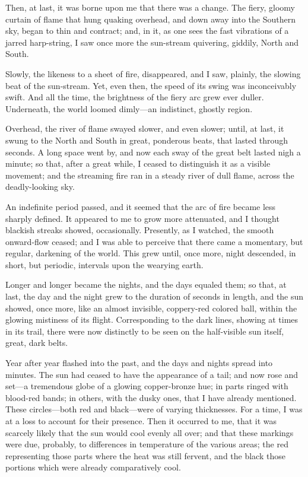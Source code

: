 Then, at last, it was borne upon me that there was a change. The fiery, gloomy curtain of flame that hung quaking overhead, and down away into the Southern sky, began to thin and contract; and, in it, as one sees the fast vibrations of a jarred harp-string, I saw once more the sun-stream quivering, giddily, North and South.

Slowly, the likeness to a sheet of fire, disappeared, and I saw, plainly, the slowing beat of the sun-stream. Yet, even then, the speed of its swing was inconceivably swift. And all the time, the brightness of the fiery arc grew ever duller. Underneath, the world loomed dimly---an indistinct, ghostly region.

Overhead, the river of flame swayed slower, and even slower; until, at last, it swung to the North and South in great, ponderous beats, that lasted through seconds. A long space went by, and now each sway of the great belt lasted nigh a minute; so that, after a great while, I ceased to distinguish it as a visible movement; and the streaming fire ran in a steady river of dull flame, across the deadly-looking sky.

An indefinite period passed, and it seemed that the arc of fire became less sharply defined. It appeared to me to grow more attenuated, and I thought blackish streaks showed, occasionally. Presently, as I watched, the smooth onward-flow ceased; and I was able to perceive that there came a momentary, but regular, darkening of the world. This grew until, once more, night descended, in short, but periodic, intervals upon the wearying earth.

Longer and longer became the nights, and the days equaled them; so that, at last, the day and the night grew to the duration of seconds in length, and the sun showed, once more, like an almost invisible, coppery-red colored ball, within the glowing mistiness of its flight. Corresponding to the dark lines, showing at times in its trail, there were now distinctly to be seen on the half-visible sun itself, great, dark belts.

Year after year flashed into the past, and the days and nights spread into minutes. The sun had ceased to have the appearance of a tail; and now rose and set---a tremendous globe of a glowing copper-bronze hue; in parts ringed with blood-red bands; in others, with the dusky ones, that I have already mentioned. These circles---both red and black---were of varying thicknesses. For a time, I was at a loss to account for their presence. Then it occurred to me, that it was scarcely likely that the sun would cool evenly all over; and that these markings were due, probably, to differences in temperature of the various areas; the red representing those parts where the heat was still fervent, and the black those portions which were already comparatively cool.


